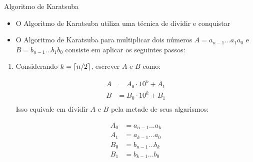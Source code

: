 \documentclass{beamer}
\DeclarePairedDelimiter{\ceil}{\lceil}{\rceil}%
\newcounter{saveenumi}
\newcommand{\seti}{\setcounter{saveenumi}{\value{enumi}}}
\begin{document}
\begin{frame}{Algoritmo de Karatsuba}
	\begin{itemize}
		\item O Algoritmo de Karatsuba utiliza uma técnica de dividir e conquistar
		\item O Algoritmo de Karatsuba para multiplicar dois números $A=a_{n-1}...a_1a_0$ e $B=b_{n-1}...b_1b_0$ consiste em aplicar os seguintes passos:
	\end{itemize}
	\begin{enumerate}
			\item Considerando $k = \ceil{n/2}$, escrever $A$ e $B$ como:

		\begin{equation}\label{eq:karatsuba}
			\begin{split}
		    	A &= A_0\cdot 10^{k}+A_1 \\
		    	B &= B_0\cdot 10^{k}+B_1\\
			\end{split}
		\end{equation}
		Isso equivale em dividir $A$ e $B$ pela metade de seus algarismos:

		\begin{equation}\label{eq:karatsuba2}
			\begin{split}
		    	A_0&= a_{n-1}...a_k\\
		    	A_1&= a_{k-1}...a_0\\
		    	B_0&= b_{n-1}...b_k\\
		    	B_1&= b_{k-1}...b_0\\
			\end{split}
		\end{equation}
		\seti
	\end{enumerate}
\end{frame}
\end{document}
